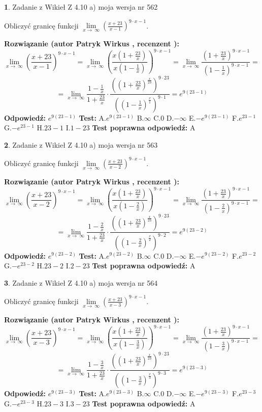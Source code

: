 \documentclass[12pt, a4paper]{article}
\theoremstyle{definition} %
\newtheorem{zad}{}
\newcommand{\zadStart}[1]{\begin{zad}#1\newline}
\newcommand{\zadStop}{\end{zad}}
\newcommand{\rozwStart}[2]{\noindent \textbf{Rozwiązanie (autor #1 , recenzent #2): }\newline}
\newcommand{\rozwStop}{\newline}
\newcommand{\odpStart}{\noindent \textbf{Odpowiedź:}\newline}
\newcommand{\odpStop}{\newline}
\newcommand{\testStart}{\noindent \textbf{Test:}\newline}
\newcommand{\testStop}{\newline}
\newcommand{\kluczStart}{\noindent \textbf{Test poprawna odpowiedź:}\newline}
\newcommand{\kluczStop}{\newline}
\begin{document}
\zadStart{Zadanie z Wikieł Z 4.10 a) moja wersja nr 562}


Obliczyć granicę funkcji  $\lim\limits_{x\to\ \infty}(\frac{x+23}{x-1})^{9\cdot x-1}$.
\zadStop
\rozwStart{Patryk Wirkus}{}
$$\lim\limits_{x\to\ \infty}(\frac{x+23}{x-1})^{9\cdot x-1} = \lim\limits_{x\to\ \infty}(\frac{x(1+\frac{23}{x})}{x(1-\frac{1}{x})})^{9\cdot x-1}=\lim\limits_{x\to\ \infty}\frac{(1+\frac{23}{x})^{9\cdot x-1}}{(1-\frac{1}{x})^{9\cdot x-1}}=$$
$$=\lim\limits_{x\to\ \infty}\frac{1-\frac{1}{x}}{1+\frac{23}{x}}\cdot\frac{((1+\frac{23}{x})^{\frac{x}{23}})^{9\cdot23}}{((1-\frac{1}{x})^{\frac{x}{1}})^{9\cdot1}}=e^{9(23-1)}$$
\rozwStop
\odpStart
$e^{9(23-1)}$
\odpStop
\testStart
A.$e^{9(23-1)}$ B.$\infty$ C.$0$ D.$-\infty$ E.$-e^{9(23-1)}$
F.$e^{23-1}$ G.$-e^{23-1}$
H.$23-1$
I.$1-23$
\testStop
\kluczStart
A
\kluczStop



\zadStart{Zadanie z Wikieł Z 4.10 a) moja wersja nr 563}


Obliczyć granicę funkcji  $\lim\limits_{x\to\ \infty}(\frac{x+23}{x-2})^{9\cdot x-1}$.
\zadStop
\rozwStart{Patryk Wirkus}{}
$$\lim\limits_{x\to\ \infty}(\frac{x+23}{x-2})^{9\cdot x-1} = \lim\limits_{x\to\ \infty}(\frac{x(1+\frac{23}{x})}{x(1-\frac{2}{x})})^{9\cdot x-1}=\lim\limits_{x\to\ \infty}\frac{(1+\frac{23}{x})^{9\cdot x-1}}{(1-\frac{2}{x})^{9\cdot x-1}}=$$
$$=\lim\limits_{x\to\ \infty}\frac{1-\frac{2}{x}}{1+\frac{23}{x}}\cdot\frac{((1+\frac{23}{x})^{\frac{x}{23}})^{9\cdot23}}{((1-\frac{2}{x})^{\frac{x}{2}})^{9\cdot2}}=e^{9(23-2)}$$
\rozwStop
\odpStart
$e^{9(23-2)}$
\odpStop
\testStart
A.$e^{9(23-2)}$ B.$\infty$ C.$0$ D.$-\infty$ E.$-e^{9(23-2)}$
F.$e^{23-2}$ G.$-e^{23-2}$
H.$23-2$
I.$2-23$
\testStop
\kluczStart
A
\kluczStop



\zadStart{Zadanie z Wikieł Z 4.10 a) moja wersja nr 564}


Obliczyć granicę funkcji  $\lim\limits_{x\to\ \infty}(\frac{x+23}{x-3})^{9\cdot x-1}$.
\zadStop
\rozwStart{Patryk Wirkus}{}
$$\lim\limits_{x\to\ \infty}(\frac{x+23}{x-3})^{9\cdot x-1} = \lim\limits_{x\to\ \infty}(\frac{x(1+\frac{23}{x})}{x(1-\frac{3}{x})})^{9\cdot x-1}=\lim\limits_{x\to\ \infty}\frac{(1+\frac{23}{x})^{9\cdot x-1}}{(1-\frac{3}{x})^{9\cdot x-1}}=$$
$$=\lim\limits_{x\to\ \infty}\frac{1-\frac{3}{x}}{1+\frac{23}{x}}\cdot\frac{((1+\frac{23}{x})^{\frac{x}{23}})^{9\cdot23}}{((1-\frac{3}{x})^{\frac{x}{3}})^{9\cdot3}}=e^{9(23-3)}$$
\rozwStop
\odpStart
$e^{9(23-3)}$
\odpStop
\testStart
A.$e^{9(23-3)}$ B.$\infty$ C.$0$ D.$-\infty$ E.$-e^{9(23-3)}$
F.$e^{23-3}$ G.$-e^{23-3}$
H.$23-3$
I.$3-23$
\testStop
\kluczStart
A
\kluczStop
\end{document}
